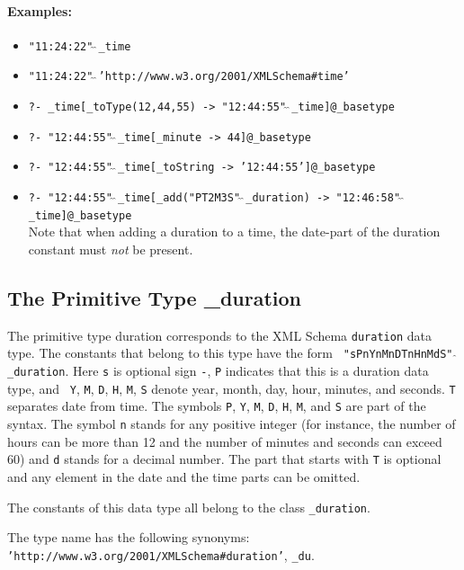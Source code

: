 \documentclass[11pt]{article}
\begin{document}
\paragraph{Examples:}
\begin{itemize}
\item {\tt "11:24:22"$\hat{~}\hat{~}$\_time}
\item {\tt "11:24:22"$\hat{~}\hat{~}$'http://www.w3.org/2001/XMLSchema\#time'}
\item {\tt ?- \_time[\_toType(12,44,55) ->
    "12:44:55"$\hat{~}\hat{~}$\_time]@\_basetype}
\item {\tt ?- "12:44:55"$\hat{~}\hat{~}$\_time[\_minute -> 44]@\_basetype}
\item {\tt ?- "12:44:55"$\hat{~}\hat{~}$\_time[\_toString -> '12:44:55']@\_basetype}
\item {\tt ?- "12:44:55"$\hat{~}\hat{~}$\_time[\_add("PT2M3S"$\hat{~}\hat{~}$\_duration) -> "12:46:58"$\hat{~}\hat{~}$\_time]@\_basetype }\\
  Note that when adding a duration to a time, the date-part of the duration
  constant must \emph{not} be present. 
\end{itemize}

\subsection{ The Primitive Type \_duration}

The primitive type duration corresponds to the XML Schema {\tt duration}
data type. The constants that belong to this type have the form {\tt
  "sPnYnMnDTnHnMdS"$\hat{~}\hat{~}$\_duration}.  Here {\tt s} is optional
sign {\tt -}, {\tt P} indicates that this is a duration data type, and {\tt
  Y}, {\tt M}, {\tt D}, {\tt H}, {\tt M}, {\tt S} denote year, month, day,
hour, minutes, and seconds. {\tt T} separates date from time. The symbols
{\tt P}, {\tt Y}, {\tt M}, {\tt D}, {\tt H}, {\tt M}, and {\tt S} are part
of the syntax.  The symbol {\tt n} stands for any positive integer (for
instance, the number of hours can be more than 12 and the number of minutes
and seconds can exceed 60) and {\tt d} stands for a decimal number. The part that starts with {\tt T}  is optional
and any element in the date and the time parts can be omitted.

The constants of this data type all belong to the class {\tt \_duration}. 

The type name has the following synonyms:
{\tt 'http://www.w3.org/2001/XMLSchema\#duration'},
{\tt \_du}.
\end{document}
